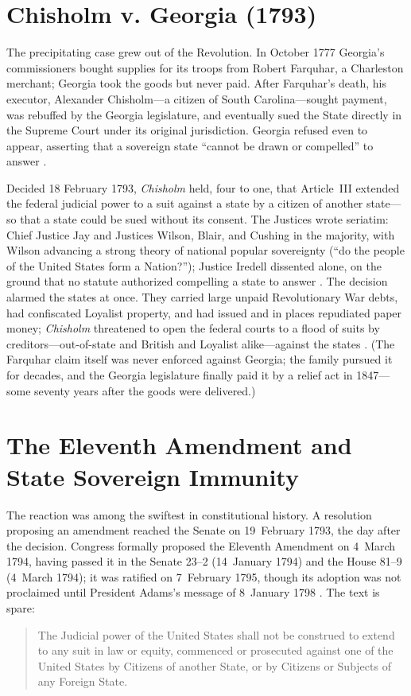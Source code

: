 \documentclass[12pt]{article}
\begin{document}
\section{Chisholm v. Georgia (1793)}
\label{sec:chisholm}

The precipitating case grew out of the Revolution. In October 1777 Georgia's
commissioners bought supplies for its troops from Robert Farquhar, a Charleston
merchant; Georgia took the goods but never paid. After Farquhar's death, his
executor, Alexander Chisholm---a citizen of South Carolina---sought payment,
was rebuffed by the Georgia legislature, and eventually sued the State directly in
the Supreme Court under its original jurisdiction. Georgia refused even to appear,
asserting that a sovereign state ``cannot be drawn or compelled'' to answer
\citep{chisholm1793, mathis1967chisholm}.

Decided 18 February 1793, \emph{Chisholm} held, four to one, that Article~III
extended the federal judicial power to a suit against a state by a citizen of
another state---so that a state could be sued without its consent. The Justices
wrote seriatim: Chief Justice Jay and Justices Wilson, Blair, and Cushing in the
majority, with Wilson advancing a strong theory of national popular sovereignty
(``do the people of the United States form a Nation?''); Justice Iredell dissented
alone, on the ground that no statute authorized compelling a state to answer
\citep{chisholm1793}. The decision alarmed the states at once. They carried large
unpaid Revolutionary War debts, had confiscated Loyalist property, and had issued
and in places repudiated paper money; \emph{Chisholm} threatened to open the
federal courts to a flood of suits by creditors---out-of-state and British and
Loyalist alike---against the states \citep{orth1987judicial, jacobs1972eleventh}.
(The Farquhar claim itself was never enforced against Georgia; the family pursued
it for decades, and the Georgia legislature finally paid it by a relief act in
1847---some seventy years after the goods were delivered.)

\section{The Eleventh Amendment and State Sovereign Immunity}
\label{sec:amendment}

The reaction was among the swiftest in constitutional history. A resolution
proposing an amendment reached the Senate on 19~February 1793, the day after the
decision. Congress formally proposed the Eleventh Amendment on 4~March 1794,
having passed it in the Senate 23--2 (14~January 1794) and the House 81--9
(4~March 1794); it was ratified on 7~February 1795, though its adoption was not
proclaimed until President Adams's message of 8~January 1798
\citep{amend11_1795}. The text is spare:
\begin{quote}
The Judicial power of the United States shall not be construed to extend to any
suit in law or equity, commenced or prosecuted against one of the United States by
Citizens of another State, or by Citizens or Subjects of any Foreign State.
\end{quote}
\end{document}
